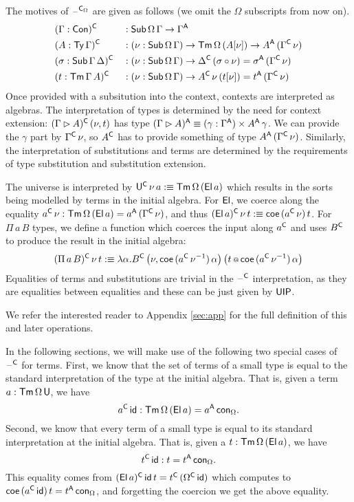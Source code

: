 \documentclass[acmsmall,review,anonymous]{acmart}\settopmatter{printfolios=true,printccs=false,printacmref=false}
\begin{document}
The motives of $\mathord{\hspace{1pt}\text{--}\hspace{1pt}}^{\mathsf{C}_\Omega}$ are given as follows (we omit the
$\Omega$ subscripts from now on).
\begin{alignat*}{5}
  & (\Gamma:\mathsf{Con})^{\mathsf{C}} && : \mathsf{Sub}\,\Omega\,\Gamma\rightarrow\Gamma^{\mathsf{A}} \\
  & (A:\mathsf{Ty}\,\Gamma)^{\mathsf{C}} && : (\nu:\mathsf{Sub}\,\Omega\,\Gamma)\rightarrow\mathsf{Tm}\,\Omega\,(A[\nu])\rightarrow A^{\mathsf{A}}\,(\Gamma^{\mathsf{C}}\,\nu) \\
  & (\sigma:\mathsf{Sub}\,\Gamma\,\Delta)^{\mathsf{C}} && : (\nu:\mathsf{Sub}\,\Omega\,\Gamma)\rightarrow \Delta^{\mathsf{C}}\,(\sigma\circ\nu)=\sigma^{\mathsf{A}}\,(\Gamma^{\mathsf{C}}\,\nu) \\
  & (t:\mathsf{Tm}\,\Gamma\,A)^{\mathsf{C}} && : (\nu:\mathsf{Sub}\,\Omega\,\Gamma)\rightarrow A^{\mathsf{C}}\,\nu\,(t[\nu])=t^{\mathsf{A}}\,(\Gamma^{\mathsf{C}}\,\nu)
\end{alignat*}
Once provided with a subsitution into the context, contexts are
interpreted as algebras. The interpretation of types is determined by
the need for context extension: $(\Gamma\rhd A)^{\mathsf{C}}\,(\nu,t)$ has type
$(\Gamma\rhd A)^{\mathsf{A}}\equiv(\gamma:\Gamma^{\mathsf{A}})\times A^{\mathsf{A}}\,\gamma$. We can
provide the $\gamma$ part by $\Gamma^{\mathsf{C}}\,\nu$, so $A^{\mathsf{C}}$ has to
provide something of type $A^{\mathsf{A}}\,(\Gamma^{\mathsf{C}}\,\nu)$. Similarly, the
interpretation of substitutions and terms are determined by the
requirements of type substitution and substitution extension.

The universe is interpreted by $\mathsf{U}^{\mathsf{C}}\,\nu\,a :\equiv
\mathsf{Tm}\,\Omega\,(\mathsf{El}\,a)$ which results in the sorts being modelled by
terms in the initial algebra. For $\mathsf{El}$, we coerce along the equality
$a^{\mathsf{C}}\,\nu : \mathsf{Tm}\,\Omega\,(\mathsf{El}\,a) = a^{\mathsf{A}}\,(\Gamma^{\mathsf{C}}\,\nu)$, and thus
$(\mathsf{El}\,a)^{\mathsf{C}}\,\nu\,t :\equiv \mathsf{coe}\,(a^{\mathsf{C}}\,\nu)\,t$. For $\Pi\,a\,B$
types, we define a function which coerces the input along $a^{\mathsf{C}}$ and
uses $B^{\mathsf{C}}$ to produce the result in the initial algebra:
\[
(\Pi\,a\,B)^{\mathsf{C}}\,\nu\,t :\equiv \lambda\alpha.B^{\mathsf{C}}\,\big(\nu,\mathsf{coe}\,({a^{\mathsf{C}}\,\nu^{-1}})\,\alpha\big)\,\big(t\mathop{{\scriptstyle @}} \mathsf{coe}\,({a^{\mathsf{C}}\,\nu^{-1}})\,\alpha\big)
\]
Equalities of terms and substitutions are trivial in the $\mathord{\hspace{1pt}\text{--}\hspace{1pt}}^{\mathsf{C}}$
interpretation, as they are equalities between equalities and these
can be just given by $\mathsf{UIP}$.

We refer the interested reader to Appendix \ref{sec:app} for the full
definition of this and later operations.

In the following sections, we will make use of the following two
special cases of $\mathord{\hspace{1pt}\text{--}\hspace{1pt}}^{\mathsf{C}}$ for terms. First, we know that the set of
terms of a small type is equal to the standard interpretation of the
type at the initial algebra. That is, given a term
$a:\mathsf{Tm}\,\Omega\,\mathsf{U}$, we have
\[
a^{\mathsf{C}}\,\mathsf{id} : \mathsf{Tm}\,\Omega\,(\mathsf{El}\,a) = a^{\mathsf{A}}\,\mathsf{con}_\Omega.
\]
Second, we know that every term of a small type is equal to its
standard interpretation at the initial algebra. That is, given a
$t:\mathsf{Tm}\,\Omega\,(\mathsf{El}\,a)$, we have
\[
t^{\mathsf{C}}\,\mathsf{id} : t = t^{\mathsf{A}}\,\mathsf{con}_\Omega.
\]
This equality comes from $(\mathsf{El}\,a)^{\mathsf{C}}\,\mathsf{id}\,t =
t^{\mathsf{C}}\,(\Omega^{\mathsf{C}}\,\mathsf{id})$ which computes to $\mathsf{coe}\,(a^{\mathsf{C}}\,\mathsf{id})\,t =
t^{\mathsf{A}}\,\mathsf{con}_\Omega$, and forgetting the coercion we get the above
equality.
\end{document}
